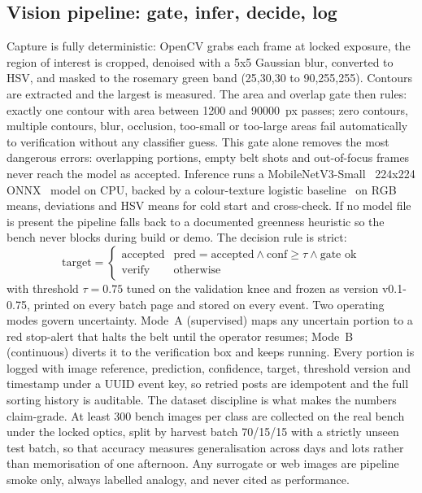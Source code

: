 \documentclass[10pt,conference,a4paper]{IEEEtran}
\begin{document}
\subsection{Vision pipeline: gate, infer, decide, log}
Capture is fully deterministic: OpenCV grabs each frame at locked exposure, the region of interest is cropped, denoised with a 5x5 Gaussian blur, converted to HSV, and masked to the rosemary green band (25,30,30 to 90,255,255). Contours are extracted and the largest is measured. The area and overlap gate then rules: exactly one contour with area between 1200 and 90000~px passes; zero contours, multiple contours, blur, occlusion, too-small or too-large areas fail automatically to verification without any classifier guess. This gate alone removes the most dangerous errors: overlapping portions, empty belt shots and out-of-focus frames never reach the model as accepted.
Inference runs a MobileNetV3-Small~\cite{howard2019} 224x224 ONNX~\cite{onnx} model on CPU, backed by a colour-texture logistic baseline~\cite{alpaydin2020} on RGB means, deviations and HSV means for cold start and cross-check. If no model file is present the pipeline falls back to a documented greenness heuristic so the bench never blocks during build or demo. The decision rule is strict:
\begin{equation}
\text{target}=\begin{cases} \text{accepted} & \text{pred}=\text{accepted} \wedge \text{conf}\ge\tau \wedge \text{gate ok} \\ \text{verify} & \text{otherwise} \end{cases}
\end{equation}
with threshold $\tau=0.75$ tuned on the validation knee and frozen as version v0.1-0.75, printed on every batch page and stored on every event. Two operating modes govern uncertainty. Mode~A (supervised) maps any uncertain portion to a red stop-alert that halts the belt until the operator resumes; Mode~B (continuous) diverts it to the verification box and keeps running. Every portion is logged with image reference, prediction, confidence, target, threshold version and timestamp under a UUID event key, so retried posts are idempotent and the full sorting history is auditable.
The dataset discipline is what makes the numbers claim-grade. At least 300 bench images per class are collected on the real bench under the locked optics, split by harvest batch 70/15/15 with a strictly unseen test batch, so that accuracy measures generalisation across days and lots rather than memorisation of one afternoon. Any surrogate or web images are pipeline smoke only, always labelled analogy, and never cited as performance.
\end{document}

